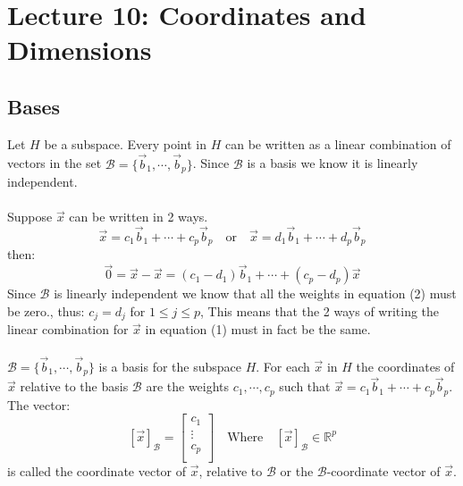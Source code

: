 \documentclass[11pt, a4paper]{article}
\newcommand*{\R}{\ensuremath{\mathbb{R}}}
\begin{document}
\setcounter{section}{9}

\section{Lecture 10: Coordinates and Dimensions}
\subsection{Bases}
Let $H$ be a subspace. Every point in $H$ can be written as a linear combination of vectors in the set $\mathcal{B} = \{\vec{b}_1, \cdots, \vec{b}_p \}$. Since $\mathcal{B}$ is a basis we know it is linearly independent.\\
\\

Suppose $\vec{x}$ can be written in 2 ways.
\begin{equation}
    \vec{x} = c_1\vec{b}_1 + \cdots + c_p\vec{b}_p \quad \text{or} \quad     \vec{x} = d_1\vec{b}_1 + \cdots + d_p\vec{b}_p
\end{equation}
then:
\begin{equation}
    \vec{0} = \vec{x} - \vec{x} = (c_1 - d_1)\vec{b}_1 + \cdots + (c_p - d_p)\vec{x}
\end{equation}
Since $\mathcal{B}$ is linearly independent we know that all the weights in equation (2) must be zero., thus: $c_j = d_j$ for $1 \leq j \leq p$, This means that the 2 ways of writing the linear combination for $\vec{x}$ in equation (1) must in fact be the same.\\
\\
$\mathcal{B} = \{ \vec{b}_1, \cdots, \vec{b}_p \}$ is a basis for the subspace $H$. For each $\vec{x}$ in $H$ the coordinates of $\vec{x}$ relative to the basis $\mathcal{B}$ are the weights $c_1, \cdots, c_p$ such that $\vec{x} = c_1\vec{b}_1 + \cdots + c_p\vec{b}_p$. The vector:
\begin{equation}
    \left[ \vec{x} \right]_{\mathcal{B}} = \begin{bmatrix} c_1 \\ \vdots \\ c_p\\ \end{bmatrix} \quad \text{Where} \quad \left[ \vec{x} \right]_{\mathcal{B}} \in \R^p
\end{equation}
is called the coordinate vector of $\vec{x}$, relative to $\mathcal{B}$ or the $\mathcal{B}$-coordinate vector of $\vec{x}$.
\end{document}
